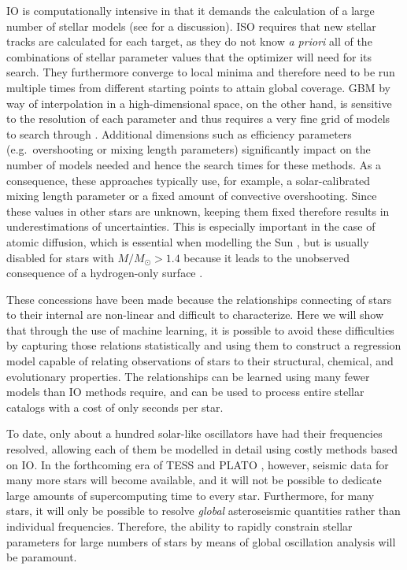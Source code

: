 IO is computationally intensive in that it demands the calculation of a large number of stellar models (see \citealt{2009ApJ...699..373M} for a discussion). ISO requires that new stellar tracks are calculated for each target, as they do not know \emph{a priori} all of the combinations of stellar parameter values that the optimizer will need for its search. They furthermore converge to local minima and therefore need to be run multiple times from different starting points to attain global coverage. GBM by way of interpolation in a high-dimensional space, on the other hand, is sensitive to the resolution of each parameter and thus requires a very fine grid of models to search through \citep[see e.g.][who use more than five million models that were varied in just four initial parameters]{2010ApJ...725.2176Q}. Additional dimensions such as efficiency parameters (e.g.\ overshooting or mixing length parameters) significantly impact on the number of models needed and hence the search times for these methods. As a consequence, these approaches typically use, for example, a solar-calibrated mixing length parameter or a fixed amount of convective overshooting. Since these values in other stars are unknown, keeping them fixed therefore results in underestimations of uncertainties. This is especially important in the case of atomic diffusion, which is essential when modelling the Sun \citep[see e.g.][]{1994MNRAS.269.1137B}, but is usually disabled for stars with ${M/M_\odot > 1.4}$ because it leads to the unobserved consequence of a hydrogen-only surface \citep{2002A&A...390..611M}. 

These concessions have been made because the relationships connecting  of stars to their internal  are non-linear and difficult to characterize. Here we will show that through the use of machine learning, it is possible to avoid these difficulties by capturing those relations statistically and using them to construct a regression model capable of relating observations of stars to their structural, chemical, and evolutionary properties. The relationships can be learned using many fewer models than IO methods require, and can be used to process entire stellar catalogs with a cost of only seconds per star. 

To date, only about a hundred solar-like oscillators have had their frequencies resolved, allowing each of them be modelled in detail using costly methods based on IO. In the forthcoming era of TESS \citep{2015JATIS...1a4003R} and PLATO \citep{2014ExA....38..249R}, however, seismic data for many more stars will become available, and it will not be possible to dedicate large amounts of supercomputing time to every star. Furthermore, for many stars, it will only be possible to resolve \emph{global} asteroseismic quantities rather than individual frequencies. Therefore, the ability to rapidly constrain stellar parameters for large numbers of stars by means of global oscillation analysis will be paramount. 

